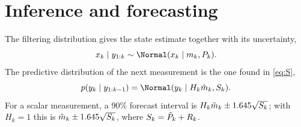 \section{Inference and forecasting}
 The filtering distribution gives the state estimate together with its uncertainty,
\begin{equation}
  x_k \mid y_{1:k} \sim \Normal(x_k \mid m_k, P_k).
\end{equation}
 The predictive distribution of the next measurement is the one found in \eqref{eq:S},
\begin{equation}
  p(y_k \mid y_{1:k-1}) = \Normal(y_k \mid H_k\mt_k, S_k).
\end{equation}
For a scalar measurement, a $90\%$ forecast interval is $H_k\tilde m_k \pm 1.645\sqrt{S_k}$; with $H_k = 1$ this is $\tilde m_k \pm 1.645\sqrt{S_k}$, where $S_k = \tilde P_k + R_k$.


